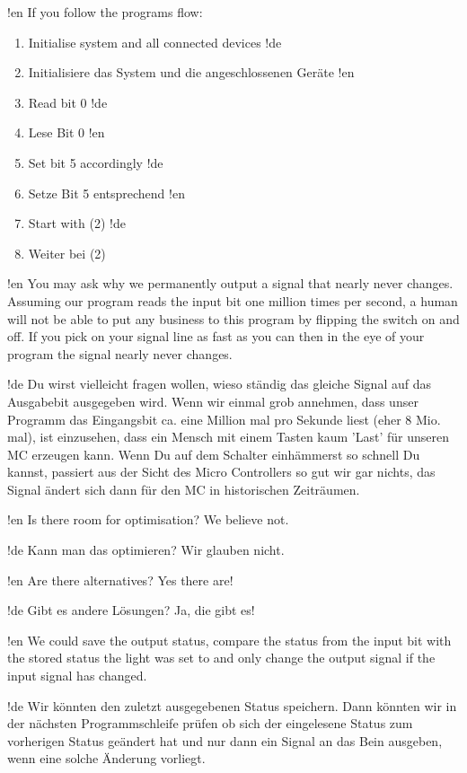 !en If you follow the programs flow:

\begin{enumerate}
!en   \item Initialise system and all connected devices
!de   \item Initialisiere das System und die angeschlossenen Geräte
!en   \item Read bit 0
!de   \item Lese Bit 0
!en   \item Set bit 5 accordingly
!de   \item Setze Bit 5 entsprechend
!en   \item Start with (2)
!de   \item Weiter bei (2)
\end{enumerate}

!en You may ask why we permanently output a signal that nearly never changes. Assuming our program reads the input bit one million times per second, a human will not be able to put any business to this program by flipping the switch on and off. If you pick on your signal line as fast as you can then in the eye of your program the signal nearly never changes.

!de Du wirst vielleicht fragen wollen, wieso ständig das gleiche Signal auf das Ausgabebit ausgegeben wird. Wenn wir einmal grob annehmen, dass unser Programm das Eingangsbit ca. eine Million mal pro Sekunde liest (eher 8 Mio. mal), ist einzusehen, dass ein Mensch mit einem Tasten kaum 'Last' für unseren MC erzeugen kann. Wenn Du auf dem Schalter einhämmerst so schnell Du kannst, passiert aus der Sicht des Micro Controllers so gut wir gar nichts, das Signal ändert sich dann für den MC in historischen Zeiträumen.


!en Is there room for optimisation? We believe not.

!de Kann man das optimieren? Wir glauben nicht.



!en Are there alternatives? Yes there are!

!de Gibt es andere Lösungen? Ja, die gibt es!



!en We could save the output status, compare the status from the input bit with the stored status the light was set to and only change the output signal if the input signal has changed.

!de Wir könnten den zuletzt ausgegebenen Status speichern. Dann könnten wir in der nächsten Programmschleife prüfen ob sich der eingelesene Status zum vorherigen Status geändert hat und nur dann ein Signal an das Bein ausgeben, wenn eine solche Änderung vorliegt.



